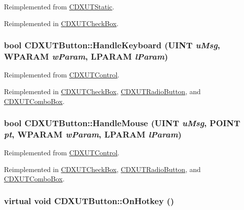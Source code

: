 Reimplemented from \hyperlink{class_c_d_x_u_t_static_ae32024764670a1f5b1ad0ba4a8570d63}{CDXUTStatic}.

Reimplemented in \hyperlink{class_c_d_x_u_t_check_box_af0a106a73957da96d23dd53c2b9da8e8}{CDXUTCheckBox}.\hypertarget{class_c_d_x_u_t_button_ae8da8eb3729b62ac3651eeca42d72530}{
\subsubsection[{HandleKeyboard}]{\setlength{\rightskip}{0pt plus 5cm}bool CDXUTButton::HandleKeyboard (UINT {\em uMsg}, \/  WPARAM {\em wParam}, \/  LPARAM {\em lParam})}}
\label{class_c_d_x_u_t_button_ae8da8eb3729b62ac3651eeca42d72530}


Reimplemented from \hyperlink{class_c_d_x_u_t_control_a94044e608adeac7c329d83cf63587dcf}{CDXUTControl}.

Reimplemented in \hyperlink{class_c_d_x_u_t_check_box_a6e37b9b6be8e2c13df2927c1cf3d63ef}{CDXUTCheckBox}, \hyperlink{class_c_d_x_u_t_radio_button_a221492c2a117d1faaab749c1f3a88a4d}{CDXUTRadioButton}, and \hyperlink{class_c_d_x_u_t_combo_box_abe59d59e89767472038d69260ef73f9d}{CDXUTComboBox}.\hypertarget{class_c_d_x_u_t_button_ac0bb3da0b5cc77e4cadfbbed72d3e5b7}{
\subsubsection[{HandleMouse}]{\setlength{\rightskip}{0pt plus 5cm}bool CDXUTButton::HandleMouse (UINT {\em uMsg}, \/  POINT {\em pt}, \/  WPARAM {\em wParam}, \/  LPARAM {\em lParam})}}
\label{class_c_d_x_u_t_button_ac0bb3da0b5cc77e4cadfbbed72d3e5b7}


Reimplemented from \hyperlink{class_c_d_x_u_t_control_a263979b3221cb7a44b4caea72366c335}{CDXUTControl}.

Reimplemented in \hyperlink{class_c_d_x_u_t_check_box_a4638ad4bb74d1a5fae3ba2b8b01072d6}{CDXUTCheckBox}, \hyperlink{class_c_d_x_u_t_radio_button_aab0a615727913f7f6c8e8d35cc2220e6}{CDXUTRadioButton}, and \hyperlink{class_c_d_x_u_t_combo_box_a1cc659081f04fdf657f644d9970a7df8}{CDXUTComboBox}.\hypertarget{class_c_d_x_u_t_button_ae63ba50da1c035a9aaa983bafd5eae97}{
\subsubsection[{OnHotkey}]{\setlength{\rightskip}{0pt plus 5cm}virtual void CDXUTButton::OnHotkey ()}}
\label{class_c_d_x_u_t_button_ae63ba50da1c035a9aaa983bafd5eae97}


